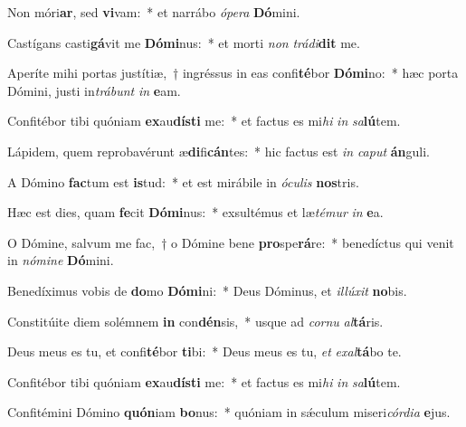 \item Non móri\textbf{ar}, sed \textbf{vi}vam:~* et narrábo \textit{ó}\textit{pe}\textit{ra} \textbf{Dó}mini.
\item Castígans casti\textbf{gá}vit me \textbf{Dó}\textbf{mi}nus:~* et morti \textit{non} \textit{trá}\textit{di}\textbf{dit} me.
\item Aperíte mihi portas justítiæ,~† ingréssus in eas confi\textbf{té}bor \textbf{Dó}\textbf{mi}no:~* hæc porta Dómini, justi in\textit{trá}\textit{bunt} \textit{in} \textbf{e}am.
\item Confitébor tibi quóniam \textbf{ex}au\textbf{dís}\textbf{ti} me:~* et factus es mi\textit{hi} \textit{in} \textit{sa}\textbf{lú}tem.
\item Lápidem, quem reprobavérunt æ\textbf{di}fi\textbf{cán}tes:~* hic factus est \textit{in} \textit{ca}\textit{put} \textbf{án}guli.
\item A Dómino \textbf{fac}tum est \textbf{is}tud:~* et est mirábile in \textit{ó}\textit{cu}\textit{lis} \textbf{nos}tris.
\item Hæc est dies, quam \textbf{fe}cit \textbf{Dó}\textbf{mi}nus:~* exsultémus et læ\textit{té}\textit{mur} \textit{in} \textbf{e}a.
\item O Dómine, salvum me fac,~† o Dómine bene \textbf{pro}spe\textbf{rá}re:~* benedíctus qui venit in \textit{nó}\textit{mi}\textit{ne} \textbf{Dó}mini.
\item Benedíximus vobis de \textbf{do}mo \textbf{Dó}\textbf{mi}ni:~* Deus Dóminus, et \textit{il}\textit{lú}\textit{xit} \textbf{no}bis.
\item Constitúite diem solémnem \textbf{in} con\textbf{dén}sis,~* usque ad \textit{cor}\textit{nu} \textit{al}\textbf{tá}ris.
\item Deus meus es tu, et confi\textbf{té}bor \textbf{ti}bi:~* Deus meus es tu, \textit{et} \textit{ex}\textit{al}\textbf{tá}bo te.
\item Confitébor tibi quóniam \textbf{ex}au\textbf{dís}\textbf{ti} me:~* et factus es mi\textit{hi} \textit{in} \textit{sa}\textbf{lú}tem.
\item Confitémini Dómino \textbf{quón}iam \textbf{bo}nus:~* quóniam in sǽculum miseri\textit{cór}\textit{di}\textit{a} \textbf{e}jus.
